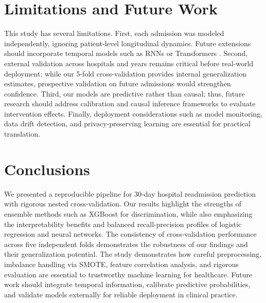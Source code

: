 \section{Limitations and Future Work}
This study has several limitations. First, each admission was modeled independently, ignoring patient-level longitudinal dynamics. Future extensions should incorporate temporal models such as RNNs \cite{choi2016doctor} or Transformers \cite{vaswani2017attention}. Second, external validation across hospitals and years remains critical before real-world deployment; while our 5-fold cross-validation provides internal generalization estimates, prospective validation on future admissions would strengthen confidence. Third, our models are predictive rather than causal; thus, future research should address calibration \cite{zadrozny2001calibration,platt1999probabilistic} and causal inference frameworks \cite{pearl2009causality,shalit2017estimating} to evaluate intervention effects. Finally, deployment considerations such as model monitoring, data drift detection, and privacy-preserving learning are essential for practical translation.


\section{Conclusions}
We presented a reproducible pipeline for 30-day hospital readmission prediction with rigorous nested cross-validation. Our results highlight the strengths of ensemble methods such as XGBoost for discrimination, while also emphasizing the interpretability benefits and balanced recall-precision profiles of logistic regression and neural networks. The consistency of cross-validation performance across five independent folds demonstrates the robustness of our findings and their generalization potential. The study demonstrates how careful preprocessing, imbalance handling via SMOTE, feature correlation analysis, and rigorous evaluation are essential to trustworthy machine learning for healthcare. Future work should integrate temporal information, calibrate predictive probabilities, and validate models externally for reliable deployment in clinical practice.







